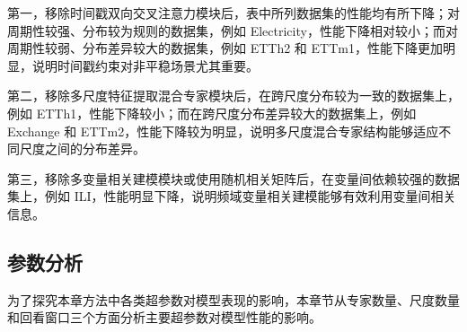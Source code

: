 第一，移除时间戳双向交叉注意力模块后，表中所列数据集的性能均有所下降；对周期性较强、分布较为规则的数据集，例如 Electricity，性能下降相对较小；而对周期性较弱、分布差异较大的数据集，例如 ETTh2 和 ETTm1，性能下降更加明显，说明时间戳约束对非平稳场景尤其重要。

第二，移除多尺度特征提取混合专家模块后，在跨尺度分布较为一致的数据集上，例如 ETTh1，性能下降较小；而在跨尺度分布差异较大的数据集上，例如 Exchange 和 ETTm2，性能下降较为明显，说明多尺度混合专家结构能够适应不同尺度之间的分布差异。

第三，移除多变量相关建模模块或使用随机相关矩阵后，在变量间依赖较强的数据集上，例如 ILI，性能明显下降，说明频域变量相关建模能够有效利用变量间相关信息。

\begin{table}[t!]
    \centering
    \caption{多元时间序列预测方法在不同专家数量下的对比实验}
    \label{tab:numExpert}
\end{table}

\subsection{参数分析}
为了探究本章方法中各类超参数对模型表现的影响，本章节从专家数量、尺度数量和回看窗口三个方面分析主要超参数对模型性能的影响。

